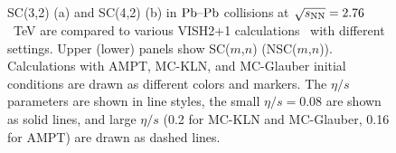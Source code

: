 \begin{figure}[!]
\begin{center}
        \caption{SC(3,2) (a) and SC(4,2) (b) in $\textnormal{Pb--Pb}$ collisions at $\sqrt{s_{\textnormal{NN}}}=2.76$~TeV are compared to various VISH2+1 calculations~\cite{Zhu:2016puf} with different settings. Upper (lower) panels show SC($m$,$n$) (NSC($m$,$n$)).
        Calculations with AMPT, MC-KLN, and MC-Glauber initial conditions are drawn as different colors and markers. The $\eta/s$ parameters are shown in line styles, the small $\eta/s=0.08$ are shown as solid lines, and large $\eta/s$ (0.2 for MC-KLN and MC-Glauber, 0.16 for AMPT) are drawn as dashed lines. }
         \label{fig:Figure_3}
        \end{center}   
 \end{figure}
 

